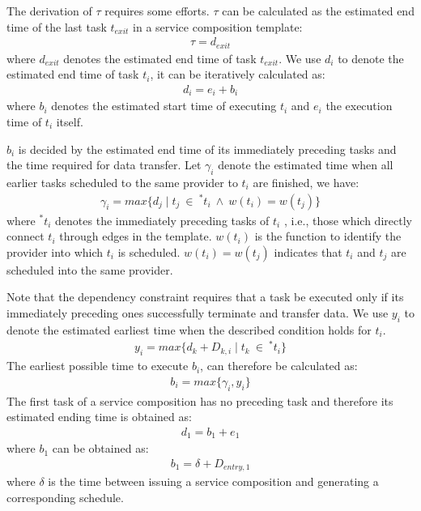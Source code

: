 \documentclass[journal]{IEEEtran}
\begin{document}
The derivation of $\tau$ requires some efforts. $\tau$ can be calculated as the estimated end time of the last task $t_{exit}$ in a service composition template:
\begin{align}
\tau = d_{exit}
\end{align}
where $d_{exit}$ denotes the estimated end time of task $t_{exit}$. We use $d_i$ to denote the estimated end time of task $t_i$, it can be iteratively calculated as:
\begin{align}
d_i = e_i + b_i
\end{align}
where $b_i$ denotes the estimated start time of executing $t_i$ and $e_i$ the execution time of $t_i$ itself.

$b_i$ is decided by the estimated end time of its immediately preceding tasks and the time required for data transfer. Let $\gamma_i$ denote the estimated time when all earlier tasks scheduled to the same provider to $t_i$ are finished, we have:
\begin{align}
\gamma_i =  max\{d_j \mid t_j \ \in \ ^{*}t_i \ \wedge \ w(t_i) = w(t_j) \}
\end{align}
where $^{*}t_i$ denotes the immediately preceding tasks of $t_i$ , i.e., those which directly connect $t_i$ through edges in the template. 
$w(t_i)$ is the function to identify the provider into which $t_i$ is scheduled. $w(t_i) = w(t_j)$ indicates that $t_i$ and $t_j$ are scheduled into the same provider.

Note that the dependency constraint requires that a task be executed only if its immediately preceding ones successfully terminate and transfer data. We use $y_i$ to denote the estimated earliest time when the described condition holds for $t_i$.
\begin{align}
y_i = max \{d_k + D_{k,i} \mid t_k \ \in \ ^{*}t_i \} 
\end{align}
The earliest possible time to execute $b_i$, can therefore be calculated as:
\begin{align}
b_i = max \{ \gamma_i, y_i \}
\end{align}
The first task of a service composition has no preceding task and therefore its estimated ending time is obtained as:
\begin{align}
d_1 = b_1 + e_1
\end{align}
where $b_1$ can be obtained as:
\begin{align}
b_1 = \delta + D_{entry, 1}
\end{align}
where $\delta$ is the time between issuing a service composition and generating a corresponding schedule.
\end{document}
